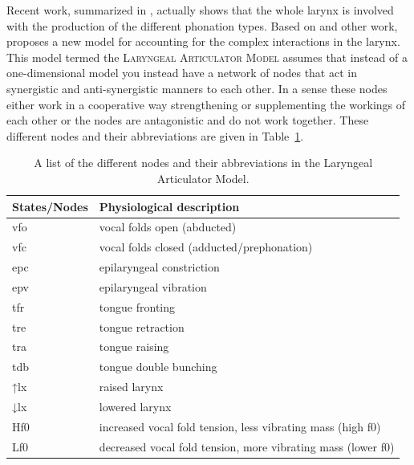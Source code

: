 \documentclass[12pt, letterpaper]{article}
\providecommand{\lsptoprule}{\midrule\toprule}
\providecommand{\lspbottomrule}{\bottomrule\midrule}
\begin{document}


Recent work, summarized in \citet{eslingVoiceQualityLaryngeal2019}, actually shows that the whole larynx is involved with the production of the different phonation types. Based on \citet{moisikModelingBiomechanicalInfluence2014} and other work, \citet{eslingVoiceQualityLaryngeal2019} proposes a new model for accounting for the complex interactions in the larynx. This model termed the \textsc{Laryngeal Articulator Model} assumes that instead of a one-dimensional model you instead have a network of nodes that act in synergistic and anti-synergistic manners to each other. In a sense these nodes either work in a cooperative way strengthening or supplementing the workings of each other or the nodes are antagonistic and do not work together. These different nodes and their abbreviations are given in Table~\ref{tab:States}.
\begin{table}[!ht]
	\centering
	\caption{A list of the different nodes and their abbreviations in the Laryngeal Articulator Model.}
	\label{tab:States}
	 \begin{tabular}{ll}
	  \lsptoprule
	  States/Nodes	&	 Physiological description \\
	  \hline
	  	vfo   	&  vocal folds open (abducted) \\
		vfc    	&  vocal folds closed (adducted/prephonation)\\
		epc   	&  epilaryngeal constriction\\
		epv			&  epilaryngeal vibration \\
		tfr 		&  tongue fronting \\
		tre 		&  tongue retraction \\
		tra 		&  tongue raising \\
		tdb 		&	 tongue double bunching\\
		↑lx     &  raised larynx\\
		↓lx			&  lowered larynx\\
		Hf0			&  increased vocal fold tension, less vibrating mass (high f0)\\
		Lf0			&  decreased vocal fold tension, more vibrating mass (lower f0)\\
	  \lspbottomrule
	 \end{tabular}
\end{table}
\end{document}
